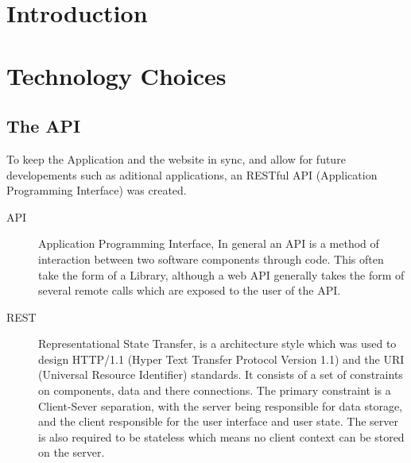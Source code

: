 \documentclass[11pt,a4paper]{article}
\begin{document}


\newpage 

\tableofcontents

\newpage
\section{Introduction}

\section{Technology Choices}

\subsection{The API}
To keep the Application and the website in sync, and allow for future developements such as aditional applications, an RESTful API (Application Programming Interface) was created.

\begin{description}
\item[API] Application Programming Interface, In general an API is a method of interaction between two software components through code. This often take the form of a Library, although a web API generally takes the form of several remote calls which are exposed to the user of the API. 

\item[REST] Representational State Transfer, is a architecture style which was used to design HTTP/1.1 (Hyper Text Transfer Protocol Version 1.1) and the URI (Universal Resource Identifier) standards. It consists of a set of constraints on components, data and there connections. The primary constraint is a Client-Sever separation, with the server being responsible for data storage, and the client responsible for the user interface and user state. The server is also required to be stateless which means no client context can be stored on the server.
\end{description}
\end{document}
